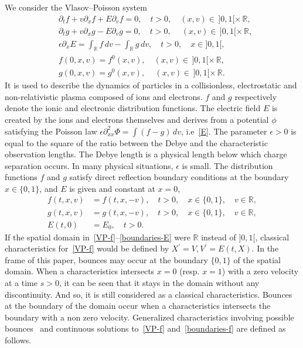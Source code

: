 \documentclass[10pt]{amsart}
\theoremstyle{definition}\newtheorem{defi}[theo]{Definition}\newtheorem{rema}[theo]{Remark}\newtheorem{exam}[theo]{Example}\newtheorem{exem}[theo]{Example}\newtheorem{nota}[theo]{Notation}
\newcommand{\R}{\mathbb{R}}
\begin{document}
We consider the Vlasov--Poisson system
\begin{align}
&\partial_t f+ v \partial_x f+ E\partial_v f= 0, \quad t>0, \quad (x,v) \in\,]0,1[\times \,\R, \label{VP-f}
\\
&\partial_t g+ v \partial_x g- E\partial_v g= 0, \quad t>0, \quad\: (x,v)\in\,]0,1[\times \,\R, \label{VP-g}
\\
&\epsilon \partial_x E= \int_{\R } f\, dv - \int_{\R } g\, dv, \quad t>0,\quad x \in]0,1[, \label{E}
\\
&f(0,x,v)= f^0(x,v), \quad (x,v) \in \,]0,1[\times \,\R, \label{init-f}
\\
&g(0,x,v)= g^0(x,v), \quad\, (x,v) \in \,]0,1[\times \,\R. \label{init-g}
\end{align}
It is used to describe the dynamics of particles in a collisionless, electrostatic and non-relativistic plasma composed of ions and electrons. $f$ and $g$ respectively denote the ionic and electronic distribution functions. The electric field $E$ is created by the ions and electrons themselves and derives from a potential $\phi$ satisfying the Poisson law $\epsilon \partial _{xx}^2\Phi = \int (f-g)\, dv$, i.e~\eqref{E}. The parameter $\epsilon >0$ is equal to the square of the ratio between the Debye and the characteristic observation lengths. The Debye length is a physical length below which charge separation occurs. In many physical situations, $\epsilon $ is small. The distribution functions $f$ and $g$ satisfy direct reflection boundary conditions at the boundary $x \in \{0,1\}$, and $E$ is given and constant at $x=0$,
\begin{align}
f(t,x,v) &= f(t,x,-v),\quad t>0, \quad x\in \{0,1\},\quad v\in \R, \label{boundaries-f}
\\
g(t,x,v) &= g(t,x,-v),\quad t>0, \quad x\in \{0,1\},\quad v\in \R, \label{boundaries-g}
\\
E(t,0) &= E_0,\quad t>0.\label{boundaries-E}
\end{align}
If the spatial domain in~\eqref{VP-f}--\eqref{boundaries-E} were $\R $ instead of $]0,1[$, classical characteristics for~\eqref{VP-f} would be defined by $X^\prime = V, V^\prime = E(t,X)$. In the frame of this paper, bounces may occur at the boundary $\{0,1\}$ of the spatial domain. When a characteristics intersects $x=0$ (resp. $x=1$) with a zero velocity at a time $s>0$, it can be seen that it stays in the domain without any discontinuity. And so, it is still considered as a classical characteristics. Bounces at the boundary of the domain occur when a characteristics intersects the boundary with a non zero velocity. Generalized characteristics involving possible bounces~\cite{Guo95,HS08} and continuous solutions to~\eqref{VP-f} and~\eqref{boundaries-f} are defined as follows.
\end{document}
